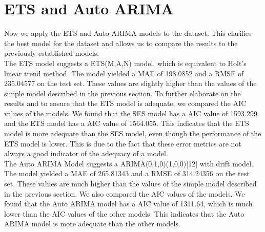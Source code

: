 \section{ETS and Auto ARIMA}\label{sec:ets-and-auto-arima}

Now we apply the ETS and Auto ARIMA models to the dataset.
This clarifies the best model for the dataset and allows us to compare the results to the previously established models.\\

The ETS model suggests a ETS(M,A,N) model, which is equivalent to Holt's linear trend method.
The model yielded a MAE of 198.0852 and a RMSE of 235.04577 on the test set.
These values are slightly higher than the values of the simple model described in the previous section.
To further elaborate on the results and to ensure that the ETS model is adequate, we compared the AIC values of the models.
We found that the SES model has a AIC value of 1593.299 and the ETS model has a AIC value of 1564.055.
This indicates that the ETS model is more adequate than the SES model, even though the performance of the ETS model is lower.
This is due to the fact that these error metrics are not always a good indicator of the adequacy of a model.\\

The Auto ARIMA Model suggests a ARIMA(0,1,0)(1,0,0)[12] with drift model.
The model yielded a MAE of 265.81343 and a RMSE of 314.24356 on the test set.
These values are much higher than the values of the simple model described in the previous section.
We also compared the AIC values of the models.
We found that the Auto ARIMA model has a AIC value of 1311.64, which is much lower than the AIC values of the other models.
This indicates that the Auto ARIMA model is more adequate than the other models.
